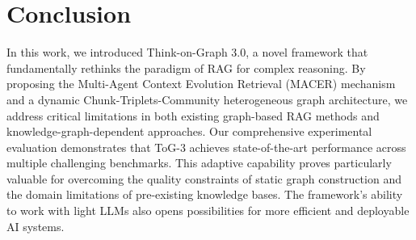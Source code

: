 \section{Conclusion}
In this work, we introduced Think-on-Graph 3.0, a novel framework that fundamentally rethinks the paradigm of RAG for complex reasoning. 
By proposing the Multi-Agent Context Evolution Retrieval (MACER) mechanism and a dynamic Chunk-Triplets-Community heterogeneous graph architecture, we address critical limitations in both existing graph-based RAG methods and knowledge-graph-dependent approaches.
Our comprehensive experimental evaluation demonstrates that ToG-3 achieves state-of-the-art performance across multiple challenging benchmarks. 
This adaptive capability proves particularly valuable for overcoming the quality constraints of static graph construction and the domain limitations of pre-existing knowledge bases.
The framework's ability to work with light LLMs also opens possibilities for more efficient and deployable AI systems.
